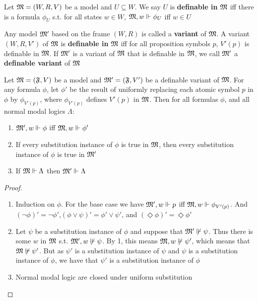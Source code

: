 \documentclass[11pt]{article}
\begin{document}
\begin{definition}
Let \(\mathfrak{M}=(W,R,V)\) be a model and \(U\subseteq W\). We say \(U\) is
\textbf{definable in} \(\mathfrak{M}\) iff there is a formula \(\phi_U\) s.t. for all states
\(w\in W\), \(\mathfrak{M},w\Vdash\phi_U\) iff \(w\in U\)

Any model \(\mathfrak{M}'\) based on the frame \((W,R)\) is called a \textbf{variant} of
\(\mathfrak{M}\). A variant \((W,R,V')\) of \(\mathfrak{M}\) is \textbf{definable in} \(\mathfrak{M}\) iff for
all proposition symbols \(p\), \(V'(p)\) is definable in \(\mathfrak{M}\). If \(\mathfrak{M}'\)
is a variant of \(\mathfrak{M}\) that is definable in \(\mathfrak{M}\), we call \(\mathfrak{M}'\) a
\textbf{definable variant} of \(\mathfrak{M}\)
\end{definition}

\begin{lemma}[]
Let \(\mathfrak{M}=(\mathfrak{F},V)\) be a model and \(\mathfrak{M}'=(\mathfrak{F},V')\) be a definable variant
of \(\mathfrak{M}\). For any formula \(\phi\), let \(\phi'\) be the result of uniformly
replacing each atomic symbol \(p\) in \(\phi\) by \(\phi_{V'(p)}\), where
\(\phi_{V'(p)}\) defines \(V'(p)\) in \(\mathfrak{M}\). Then for all formulas \(\phi\), and
all normal modal logics \(\Lambda\):
\begin{enumerate}
\item \(\mathfrak{M}',w\Vdash\phi\) iff \(\mathfrak{M},w\Vdash\phi'\)
\item If every substitution instance of \(\phi\) is true in \(\mathfrak{M}\), then every
substitution instance of \(\phi\) is true in \(\mathfrak{M}'\)
\item If \(\mathfrak{M}\Vdash\Lambda\) then \(\mathfrak{M}'\Vdash\Lambda\)
\end{enumerate}
\end{lemma}

\begin{proof}
\begin{enumerate}
\item Induction on \(\phi\). For the base case we have \(\mathfrak{M}',w\Vdash p\) iff
\(\mathfrak{M},w\Vdash\phi_{V'(p)}\). And
\((\neg\phi)'=\neg\phi'\),\((\phi\vee\psi)' =\phi'\vee\psi'\), and
\((\Diamond\phi)' =\Diamond\phi'\)
\item Let \(\psi\) be a substitution instance of \(\phi\) and suppose that
\(\mathfrak{M}'\not\Vdash\psi\). Thus there is some \(w\) in \(\mathfrak{M}\) s.t.
\(\mathfrak{M}',w\not\Vdash\psi\). By 1, this means \(\mathfrak{M},w\not\Vdash\psi'\),
which means that \(\mathfrak{M}\not\Vdash\psi'\). But as \(\psi'\) is a
substitution instance of \(\psi\) and \(\psi\) is a substitution instance of \(\phi\), we have
that \(\psi'\) is a substitution instance of \(\phi\)
\item Normal modal logic are closed under uniform substitution
\end{enumerate}
\end{proof}
\end{document}
